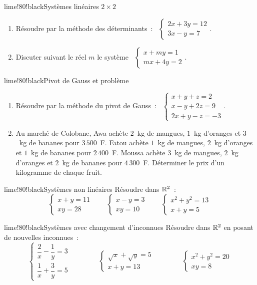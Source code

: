 \begin{exo}{lime!80!black}{Systèmes linéaires $2\times2$ }
\begin{enumerate}
  \item Résoudre par la méthode des déterminants~: \ $\begin{cases}2x+3y=12\\3x-y=7\end{cases}$.
  \item Discuter suivant le réel $m$ le système \ $\begin{cases}x+my=1\\mx+4y=2\end{cases}$.
\end{enumerate}
\end{exo}

\begin{exo}{lime!80!black}{Pivot de Gauss et problème }
\begin{enumerate}
  \item Résoudre par la méthode du pivot de Gauss~: \ $\begin{cases}x+y+z=2\\x-y+2z=9\\2x+y-z=-3\end{cases}$.
  \item Au marché de Colobane, Awa achète $2$~kg de mangues, $1$~kg d'oranges et $3$~kg de bananes pour $3\,500$~F. Fatou achète $1$~kg de mangues, $2$~kg d'oranges et $1$~kg de bananes pour $2\,400$~F. Moussa achète $3$~kg de mangues, $2$~kg d'oranges et $2$~kg de bananes pour $4\,300$~F. Déterminer le prix d'un kilogramme de chaque fruit.
\end{enumerate}
\end{exo}

\begin{exo}{lime!80!black}{Systèmes non linéaires }
Résoudre dans $\mathbb{R}^2$~:
\[
\begin{cases}x+y=11\\xy=28\end{cases}\qquad
\begin{cases}x-y=3\\xy=10\end{cases}\qquad
\begin{cases}x^2+y^2=13\\x+y=5\end{cases}
\]
\end{exo}

\begin{exo}{lime!80!black}{Systèmes avec changement d'inconnues }
Résoudre dans $\mathbb{R}^2$ en posant de nouvelles inconnues~:
\[
\begin{cases}\dfrac2x-\dfrac1y=3\\[4pt]\dfrac1x+\dfrac3y=5\end{cases}
\qquad\qquad
\begin{cases}\sqrt x+\sqrt y=5\\x+y=13\end{cases}
\qquad\qquad
\begin{cases}x^2+y^2=20\\xy=8\end{cases}
\]
\end{exo}

